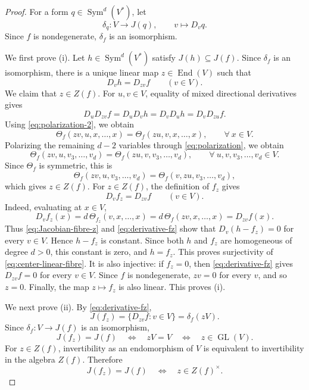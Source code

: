 \documentclass[11pt,reqno]{amsart}
\numberwithin{equation}{section}
\theoremstyle{definition}
\theoremstyle{remark}
\newcommand{\Sym}{\operatorname{Sym}}
\newcommand{\End}{\operatorname{End}}
\newcommand{\GL}{\operatorname{GL}}
\begin{document}
\begin{proof}
For a form $q\in\Sym^d(V^*)$, let
\begin{equation}\label{eq:nondegeneracyiso}
  \delta_q:V\longrightarrow J(q),\qquad
  v\longmapsto D_vq.
\end{equation}
Since $f$ is nondegenerate, $\delta_f$ is an isomorphism.

We first prove (i).  Let $h\in\Sym^d(V^*)$ satisfy
$J(h)\subseteq J(f)$.  Since $\delta_f$ is an isomorphism, there is a
unique linear map $z\in\End(V)$ such that
\begin{equation}\label{eq:Jacobian-fibre-z}
  D_vh=D_{zv}f\qquad(v\in V).
\end{equation}
We claim that $z\in Z(f)$.  For $u,v\in V$, equality of mixed
directional derivatives gives
\[
  D_uD_{zv}f
  =D_uD_vh
  =D_vD_uh
  =D_vD_{zu}f.
\]
Using \eqref{eq:polarization-2}, we obtain
\[ \Theta_f(zv,u,x,\ldots,x)
  =
  \Theta_f(zu,v,x,\ldots,x),\qquad \forall\ x\in V.\]
Polarizing the remaining $d-2$ variables through \eqref{eq:polarization}, we obtain
\[
  \Theta_f(zv,u,v_3,\ldots,v_d)
  =
  \Theta_f(zu,v,v_3,\ldots,v_d),\qquad \forall\ u,v,v_3,\ldots,v_d\in V.
\]
Since $\Theta_f$ is symmetric,
this is
\[
  \Theta_f(zv,u,v_3,\ldots,v_d)
  =
  \Theta_f(v,zu,v_3,\ldots,v_d),
\]
which gives $z\in Z(f)$. For $z\in Z(f)$, the definition of $f_z$ gives
\begin{equation}\label{eq:derivative-fz}
  D_vf_z=D_{zv}f\qquad(v\in V).
\end{equation}
Indeed, evaluating at $x\in V$,
\[
  D_vf_z(x)
  =d\,\Theta_{f_z}(v,x,\ldots,x)
  =d\,\Theta_f(zv,x,\ldots,x)
  =D_{zv}f(x).
\]
Thus \eqref{eq:Jacobian-fibre-z} and
\eqref{eq:derivative-fz} show that $D_v(h-f_z)=0$ for every $v\in V$. Hence $h-f_z$ is constant.  Since both $h$ and $f_z$ are homogeneous
of degree $d>0$, this constant is zero, and $h=f_z$.
This proves surjectivity of \eqref{eq:center-linear-fibre}.  It is also injective:
if $f_z=0$, then \eqref{eq:derivative-fz} gives
$D_{zv}f=0$ for every $v\in V$.  Since $f$ is nondegenerate,
$zv=0$ for every $v$, and so $z=0$.  Finally, the map $z\mapsto f_z$ is also linear.  This proves (i).

We next prove (ii).  By \eqref{eq:derivative-fz},
\[
  J(f_z)
  =\{D_{zv}f:v\in V\}
  =\delta_f(zV).
\]
Since $\delta_f:V\to J(f)$ is an isomorphism,
\[
  J(f_z)=J(f)
  \quad\Longleftrightarrow\quad
  zV=V
  \quad\Longleftrightarrow\quad
  z\in\GL(V).
\]
For $z\in Z(f)$, invertibility as an endomorphism of $V$ is
equivalent to invertibility in the algebra $Z(f)$. Therefore
\[
  J(f_z)=J(f)
  \quad\Longleftrightarrow\quad
  z\in Z(f)^\times.
\]


\end{proof}
\end{document}
